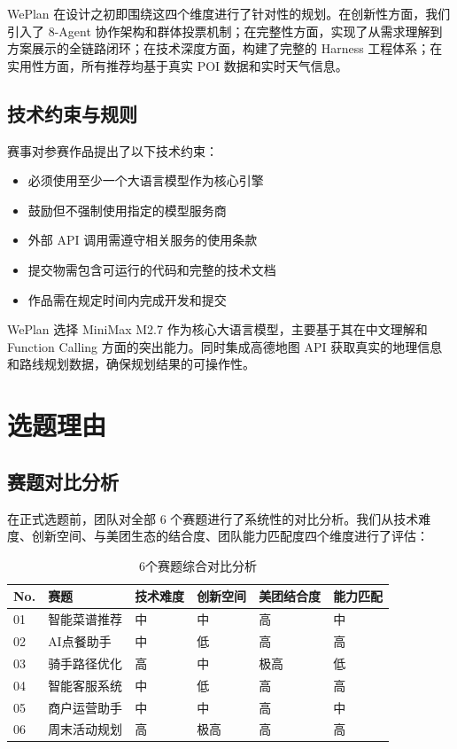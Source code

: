 \documentclass[12pt,a4paper]{ctexart}
\begin{document}
WePlan 在设计之初即围绕这四个维度进行了针对性的规划。在创新性方面，我们引入了 8-Agent 协作架构和群体投票机制；在完整性方面，实现了从需求理解到方案展示的全链路闭环；在技术深度方面，构建了完整的 Harness 工程体系；在实用性方面，所有推荐均基于真实 POI 数据和实时天气信息。

\subsection{技术约束与规则}

赛事对参赛作品提出了以下技术约束：

\begin{itemize}[leftmargin=2em]
  \item 必须使用至少一个大语言模型作为核心引擎
  \item 鼓励但不强制使用指定的模型服务商
  \item 外部 API 调用需遵守相关服务的使用条款
  \item 提交物需包含可运行的代码和完整的技术文档
  \item 作品需在规定时间内完成开发和提交
\end{itemize}

WePlan 选择 MiniMax M2.7 作为核心大语言模型，主要基于其在中文理解和 Function Calling 方面的突出能力。同时集成高德地图 API 获取真实的地理信息和路线规划数据，确保规划结果的可操作性。

\newpage

\section{选题理由}

\subsection{赛题对比分析}

在正式选题前，团队对全部 6 个赛题进行了系统性的对比分析。我们从技术难度、创新空间、与美团生态的结合度、团队能力匹配度四个维度进行了评估：

\begin{table}[H]
\centering
\caption{6个赛题综合对比分析}
\label{tab:topic-compare}
\renewcommand{\arraystretch}{1.3}
{\small
\begin{tabular}{p{0.5cm} p{2.8cm} p{2cm} p{2cm} p{2.5cm} p{2.5cm}}
\toprule
\textbf{No.} & \textbf{赛题} & \textbf{技术难度} & \textbf{创新空间} & \textbf{美团结合度} & \textbf{能力匹配} \\
\midrule
01 & 智能菜谱推荐 & 中 & 中 & 高 & 中 \\
02 & AI点餐助手 & 中 & 低 & 高 & 高 \\
03 & 骑手路径优化 & 高 & 中 & 极高 & 低 \\
04 & 智能客服系统 & 中 & 低 & 高 & 高 \\
05 & 商户运营助手 & 中 & 中 & 高 & 中 \\
06 & 周末活动规划 & 高 & 极高 & 高 & 高 \\
\bottomrule
\end{tabular}
}
\end{table}
\end{document}
